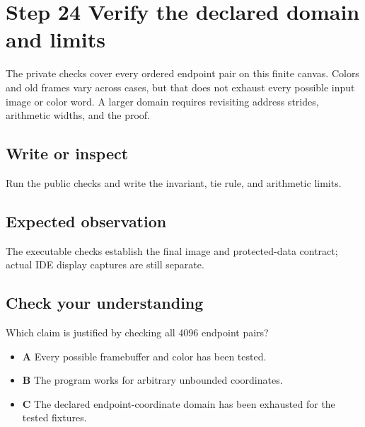 \section{Step 24 Verify the declared domain and
  limits}\label{007-bresenham-line-s24-step-24-verify-the-declared-domain-and-limits}

The private checks cover every ordered endpoint pair on this finite
canvas. Colors and old frames vary across cases, but that does not
exhaust every possible input image or color word. A larger domain
requires revisiting address strides, arithmetic widths, and the proof.

\subsection{Write or
  inspect}\label{007-bresenham-line-s24-write-or-inspect}

Run the public checks and write the invariant, tie rule, and arithmetic
limits.

\subsection{Expected
  observation}\label{007-bresenham-line-s24-expected-observation}

The executable checks establish the final image and protected-data
contract; actual IDE display captures are still separate.

\subsection{Check your
  understanding}\label{007-bresenham-line-s24-check-your-understanding}

Which claim is justified by checking all 4096 endpoint pairs?

\begin{itemize}
  \tightlist
  \item
        \textbf{A} Every possible framebuffer and color has been tested.
  \item
        \textbf{B} The program works for arbitrary unbounded coordinates.
  \item
        \textbf{C} The declared endpoint-coordinate domain has been exhausted
        for the tested fixtures.
\end{itemize}
